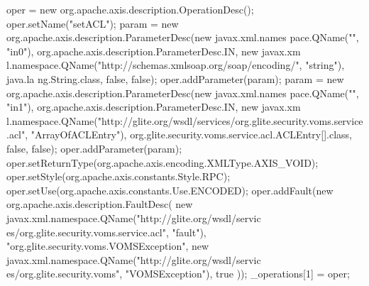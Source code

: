 \begin{DoxyCode}
{        oper = new org.apache.axis.description.OperationDesc();
        oper.setName("setACL");
        param = new org.apache.axis.description.ParameterDesc(new javax.xml.names
      pace.QName("", "in0"), org.apache.axis.description.ParameterDesc.IN, new javax.xm
      l.namespace.QName("http://schemas.xmlsoap.org/soap/encoding/", "string"), java.la
      ng.String.class, false, false);
        oper.addParameter(param);
        param = new org.apache.axis.description.ParameterDesc(new javax.xml.names
      pace.QName("", "in1"), org.apache.axis.description.ParameterDesc.IN, new javax.xm
      l.namespace.QName("http://glite.org/wsdl/services/org.glite.security.voms.service
      .acl", "ArrayOfACLEntry"), org.glite.security.voms.service.acl.ACLEntry[].class, 
      false, false);
        oper.addParameter(param);
        oper.setReturnType(org.apache.axis.encoding.XMLType.AXIS_VOID);
        oper.setStyle(org.apache.axis.constants.Style.RPC);
        oper.setUse(org.apache.axis.constants.Use.ENCODED);
        oper.addFault(new org.apache.axis.description.FaultDesc(
                      new javax.xml.namespace.QName("http://glite.org/wsdl/servic
      es/org.glite.security.voms.service.acl", "fault"),
                      "org.glite.security.voms.VOMSException",
                      new javax.xml.namespace.QName("http://glite.org/wsdl/servic
      es/org.glite.security.voms", "VOMSException"), 
                      true
                     ));
        _operations[1] = oper;

}
\end{DoxyCode}

